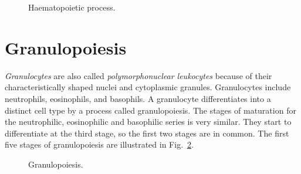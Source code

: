 \documentclass[final,a4paper,12pt,english]{UnicaPhdThesis3}
\begin{document}
\begin{figure}[!htbp]
\centering
\caption{\label{fig:Haematopoiesis} Haematopoietic process.}
\end{figure}

\section{Granulopoiesis}
\textit{Granulocytes} are also called \textit{polymorphonuclear leukocytes} because of their characteristically shaped nuclei and cytoplasmic granules. Granulocytes include neutrophils, eosinophils, and basophils. A granulocyte differentiates into a distinct cell type by a process called granulopoiesis. The stages of maturation for the neutrophilic, eosinophilic and basophilic series is very similar. They start to differentiate at the third stage, so the first two stages are in common. The first five stages of granulopoiesis are illustrated in Fig.~\ref{fig:Granulopoiesis}.
 
\begin{figure}[!htbp]
\centering
\caption{\label{fig:Granulopoiesis} Granulopoiesis.}
\end{figure}
\end{document}
